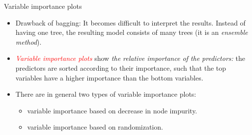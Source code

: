 \documentclass[
  10pt,
  ignorenonframetext,
]{beamer}
\providecommand{\tightlist}{%
  \setlength{\itemsep}{0pt}\setlength{\parskip}{0pt}}
\begin{document}
\begin{frame}
\begin{block}{Variable importance plots}
\protect\hypertarget{variable-importance-plots}{}
\(~\)

\begin{itemize}
\tightlist
\item
  Drawback of bagging: It becomes difficult to interpret the results.
  Instead of having one tree, the resulting model consists of many trees
  (it is an \emph{ensemble method}).
\end{itemize}

\vspace{2mm}

\begin{itemize}
\tightlist
\item
  \emph{\textcolor{red}{Variable importance plots}} show \emph{the
  relative importance of the predictors:} the predictors are sorted
  according to their importance, such that the top variables have a
  higher importance than the bottom variables.
\end{itemize}

\vspace{2mm}

\begin{itemize}
\item
  There are in general two types of variable importance plots:

  \begin{itemize}
  \tightlist
  \item
    variable importance based on decrease in node impurity.
  \item
    variable importance based on randomization.
  \end{itemize}
\end{itemize}
\end{block}
\end{frame}
\end{document}
